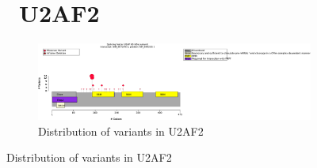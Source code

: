 \begin{figure}[htbp]
\section*{ U2AF2}
\centering
\begin{subfigure}[b]{0.95\textwidth}
\centering
\includegraphics[width=\textwidth]{ img/U2AF2_protein_diagram.pdf} 
\captionsetup{justification=raggedright,singlelinecheck=false}
\caption{Distribution of variants in U2AF2}
\end{subfigure}

\vspace{2em}


\end{figure}
